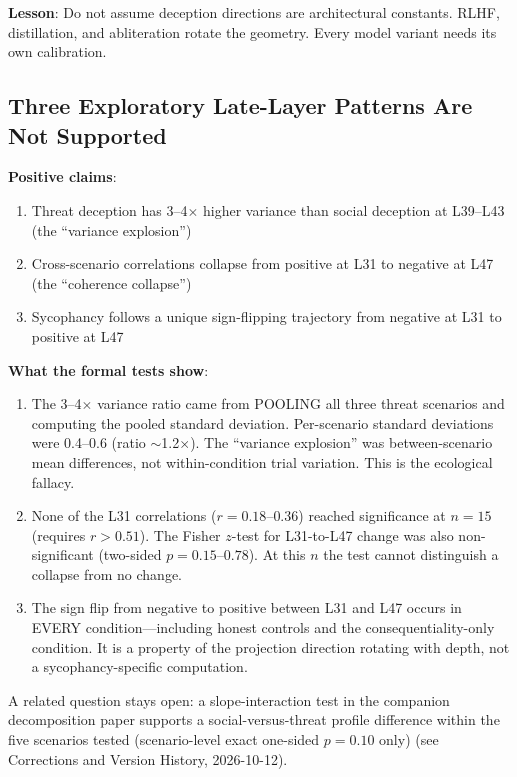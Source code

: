\documentclass[11pt,letterpaper]{article}
\begin{document}
\textbf{Lesson}: Do not assume deception directions are architectural constants. RLHF, distillation,
and abliteration rotate the geometry. Every model variant needs its own calibration.

\subsection{Three Exploratory Late-Layer Patterns Are Not Supported}\label{sec:artifacts}

\textbf{Positive claims}:
\begin{enumerate}[label=\arabic*.]
  \item Threat deception has 3--4$\times$ higher variance than social deception at L39--L43 (the
    ``variance explosion'')
  \item Cross-scenario correlations collapse from positive at L31 to negative at L47 (the
    ``coherence collapse'')
  \item Sycophancy follows a unique sign-flipping trajectory from negative at L31 to positive at L47
\end{enumerate}

\textbf{What the formal tests show}:
\begin{enumerate}[label=\arabic*.]
  \item The 3--4$\times$ variance ratio came from POOLING all three threat scenarios and computing
    the pooled standard deviation. Per-scenario standard deviations were 0.4--0.6 (ratio $\sim$1.2$\times$).
    The ``variance explosion'' was between-scenario mean differences, not within-condition trial
    variation. This is the ecological fallacy.
  \item None of the L31 correlations ($r = 0.18$--$0.36$) reached significance at $n=15$ (requires
    $r > 0.51$). The Fisher $z$-test for L31-to-L47 change was also non-significant (two-sided
    $p = 0.15$--$0.78$). At this $n$ the test cannot distinguish a collapse from no change.
  \item The sign flip from negative to positive between L31 and L47 occurs in EVERY condition---including
    honest controls and the consequentiality-only condition. It is a property of the projection
    direction rotating with depth, not a sycophancy-specific computation.
\end{enumerate}

A related question stays open: a slope-interaction test in the companion decomposition paper
supports a social-versus-threat profile difference within the five scenarios tested (scenario-level
exact one-sided $p = 0.10$ only) \cite{cc2026composites} (see Corrections and Version History, 2026-10-12).
\end{document}
